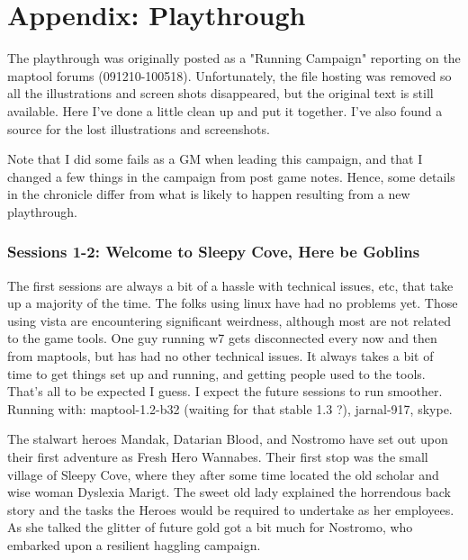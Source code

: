 \clearpage
{}
\section*{Appendix: Playthrough}
\label{sec:playthrough}

\raggedbottom

The playthrough was originally posted as a "Running Campaign" reporting on the maptool forums (091210-100518). Unfortunately, the file hosting was removed so all the illustrations and screen shots disappeared, but the original text is still available. Here I've done a little clean up and put it together. I've also found a source for the lost illustrations and screenshots.

Note that I did some fails as a GM when leading this campaign, and that I changed a few things in the campaign from post game notes. Hence, some details in the chronicle differ from what is likely to happen resulting from a new playthrough.


\subsubsection*{Sessions 1-2: Welcome to Sleepy Cove, Here be Goblins}
\noindent\small
The first sessions are always a bit of a hassle with technical issues, etc, that take up a majority of the time. The folks using linux have had no problems yet. Those using vista are encountering significant weirdness, although most are not related to the game tools. One guy running w7 gets disconnected every now and then from maptools, but has had no other technical issues.
It always takes a bit of time to get things set up and running, and getting people used to the tools. That's all to be expected I guess. I expect the future sessions to run smoother. Running with: maptool-1.2-b32 (waiting for that stable 1.3 ?), jarnal-917, skype.
\normalsize

The stalwart heroes Mandak, Datarian Blood, and Nostromo have set out upon their first adventure as Fresh Hero Wannabes. Their first stop was the small village of Sleepy Cove, where they after some time located the old scholar and wise woman Dyslexia Marigt. The sweet old lady explained the horrendous back story and the tasks the Heroes would be required to undertake as her employees. As she talked the glitter of future gold got a bit much for Nostromo, who embarked upon a resilient haggling campaign.

